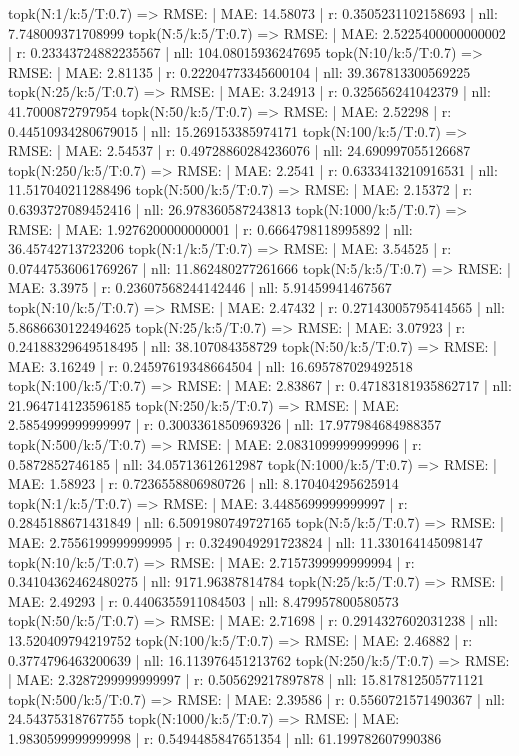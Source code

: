 topk(N:1/k:5/T:0.7) => RMSE: | MAE: 14.58073 | r: 0.3505231102158693 | nll: 7.748009371708999
topk(N:5/k:5/T:0.7) => RMSE: | MAE: 2.5225400000000002 | r: 0.23343724882235567 | nll: 104.08015936247695
topk(N:10/k:5/T:0.7) => RMSE: | MAE: 2.81135 | r: 0.22204773345600104 | nll: 39.367813300569225
topk(N:25/k:5/T:0.7) => RMSE: | MAE: 3.24913 | r: 0.325656241042379 | nll: 41.7000872797954
topk(N:50/k:5/T:0.7) => RMSE: | MAE: 2.52298 | r: 0.44510934280679015 | nll: 15.269153385974171
topk(N:100/k:5/T:0.7) => RMSE: | MAE: 2.54537 | r: 0.49728860284236076 | nll: 24.690997055126687
topk(N:250/k:5/T:0.7) => RMSE: | MAE: 2.2541 | r: 0.6333413210916531 | nll: 11.517040211288496
topk(N:500/k:5/T:0.7) => RMSE: | MAE: 2.15372 | r: 0.6393727089452416 | nll: 26.978360587243813
topk(N:1000/k:5/T:0.7) => RMSE: | MAE: 1.9276200000000001 | r: 0.6664798118995892 | nll: 36.45742713723206
topk(N:1/k:5/T:0.7) => RMSE: | MAE: 3.54525 | r: 0.07447536061769267 | nll: 11.862480277261666
topk(N:5/k:5/T:0.7) => RMSE: | MAE: 3.3975 | r: 0.23607568244142446 | nll: 5.91459941467567
topk(N:10/k:5/T:0.7) => RMSE: | MAE: 2.47432 | r: 0.27143005795414565 | nll: 5.8686630122494625
topk(N:25/k:5/T:0.7) => RMSE: | MAE: 3.07923 | r: 0.24188329649518495 | nll: 38.107084358729
topk(N:50/k:5/T:0.7) => RMSE: | MAE: 3.16249 | r: 0.24597619348664504 | nll: 16.695787029492518
topk(N:100/k:5/T:0.7) => RMSE: | MAE: 2.83867 | r: 0.47183181935862717 | nll: 21.964714123596185
topk(N:250/k:5/T:0.7) => RMSE: | MAE: 2.5854999999999997 | r: 0.3003361850969326 | nll: 17.977984684988357
topk(N:500/k:5/T:0.7) => RMSE: | MAE: 2.0831099999999996 | r: 0.5872852746185 | nll: 34.05713612612987
topk(N:1000/k:5/T:0.7) => RMSE: | MAE: 1.58923 | r: 0.7236558806980726 | nll: 8.170404295625914
topk(N:1/k:5/T:0.7) => RMSE: | MAE: 3.4485699999999997 | r: 0.2845188671431849 | nll: 6.5091980749727165
topk(N:5/k:5/T:0.7) => RMSE: | MAE: 2.7556199999999995 | r: 0.3249049291723824 | nll: 11.330164145098147
topk(N:10/k:5/T:0.7) => RMSE: | MAE: 2.7157399999999994 | r: 0.34104362462480275 | nll: 9171.96387814784
topk(N:25/k:5/T:0.7) => RMSE: | MAE: 2.49293 | r: 0.4406355911084503 | nll: 8.479957800580573
topk(N:50/k:5/T:0.7) => RMSE: | MAE: 2.71698 | r: 0.2914327602031238 | nll: 13.520409794219752
topk(N:100/k:5/T:0.7) => RMSE: | MAE: 2.46882 | r: 0.3774796463200639 | nll: 16.113976451213762
topk(N:250/k:5/T:0.7) => RMSE: | MAE: 2.3287299999999997 | r: 0.505629217897878 | nll: 15.817812505771121
topk(N:500/k:5/T:0.7) => RMSE: | MAE: 2.39586 | r: 0.5560721571490367 | nll: 24.54375318767755
topk(N:1000/k:5/T:0.7) => RMSE: | MAE: 1.9830599999999998 | r: 0.5494485847651354 | nll: 61.199782607990386

